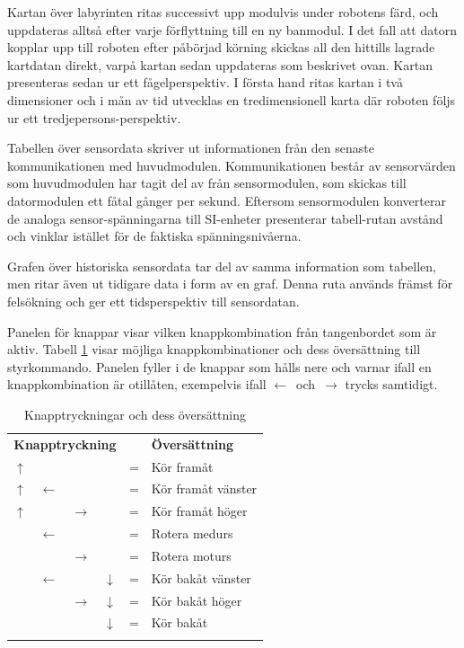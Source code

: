\documentclass[11pt]{article}
\begin{document}
\begin{flushleft}
Kartan över labyrinten ritas successivt upp modulvis under robotens färd, och uppdateras alltså efter varje förflyttning till en ny banmodul. I det fall att datorn kopplar upp till roboten efter påbörjad körning skickas all den hittills lagrade kartdatan direkt, varpå kartan sedan uppdateras som beskrivet ovan. Kartan presenteras sedan ur ett fågelperspektiv. I första hand ritas kartan i två dimensioner och i mån av tid utvecklas en tredimensionell karta där roboten följs ur ett tredjepersons-perspektiv. 

Tabellen över sensordata skriver ut informationen från den senaste kommunikationen med huvudmodulen. Kommunikationen består av sensorvärden som huvudmodulen har tagit del av från sensormodulen, som skickas till datormodulen ett fåtal gånger per sekund. Eftersom sensormodulen konverterar de analoga sensor-spänningarna till SI-enheter presenterar tabell-rutan avstånd och vinklar istället för de faktiska spänningsnivåerna. 

Grafen över historiska sensordata tar del av samma information som tabellen, men ritar även ut tidigare data i form av en graf. Denna ruta används främst för felsökning och ger ett tidsperspektiv till sensordatan.

Panelen för knappar visar vilken knappkombination från tangenbordet som är aktiv. Tabell \ref{datormodul:combinations} visar möjliga knappkombinationer och dess översättning till styrkommando. Panelen fyller i de knappar som hålls nere och varnar ifall en knappkombination är otillåten, exempelvis ifall \mbox{$\leftarrow$ och $\rightarrow$} trycks samtidigt.

\begin{longtable}{|p{.05\linewidth} p{.05\linewidth} p{.05\linewidth} p{.05\linewidth} c l|}
	\multicolumn{4}{c}{\textbf{Knapptryckning}} & & \multicolumn{1}{l}{\textbf{Översättning}} 	\\ \nobreakhline\nobreakhline 
	$\uparrow$ &  				&  				& 				& = & Kör framåt 				\\ \nobreakhline 
	$\uparrow$ & $\leftarrow$	&				&				& = & Kör framåt vänster 		\\ \nobreakhline 
	$\uparrow$ &				& $\rightarrow$	&				& = & Kör framåt höger 			\\ \nobreakhline 
			   & $\leftarrow$	&				&				& = & Rotera medurs 			\\ \nobreakhline
			   &				& $\rightarrow$	&				& = & Rotera moturs 			\\ \nobreakhline
			   & $\leftarrow$	&				& $\downarrow$	& = & Kör bakåt vänster 		\\ \nobreakhline
			   &				& $\rightarrow$ & $\downarrow$	& = & Kör bakåt höger 			\\ \nobreakhline
			   &				&				& $\downarrow$	& = & Kör bakåt 				\\ \nobreakhline
	\caption{Knapptryckningar och dess översättning} \label{datormodul:combinations}
\end{longtable}




\end{flushleft}
\end{document}
